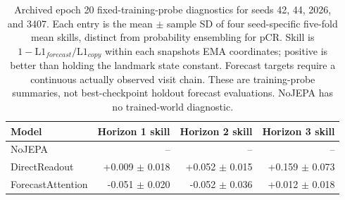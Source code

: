 \begin{table}[t]
\centering
\small
\caption{Archived epoch 20 fixed-training-probe diagnostics for seeds 42, 44, 2026, and 3407. Each entry is the mean $\pm$ sample SD of four seed-specific five-fold mean skills, distinct from probability ensembling for pCR. Skill is $1-\mathrm{L1}_{forecast}/\mathrm{L1}_{copy}$ within each snapshot\textquotesingle s EMA coordinates; positive is better than holding the landmark state constant. Forecast targets require a continuous actually observed visit chain. These are training-probe summaries, not best-checkpoint holdout forecast evaluations. NoJEPA has no trained-world diagnostic.}
\label{tab:worldprobe}
\begin{tabular}{lrrr}
\toprule
Model & Horizon 1 skill & Horizon 2 skill & Horizon 3 skill \\
\midrule
NoJEPA & -- & -- & -- \\
DirectReadout & +0.009 $\pm$ 0.018 & +0.052 $\pm$ 0.015 & +0.159 $\pm$ 0.073 \\
ForecastAttention & -0.051 $\pm$ 0.020 & -0.052 $\pm$ 0.036 & +0.012 $\pm$ 0.018 \\
\bottomrule
\end{tabular}
\end{table}
